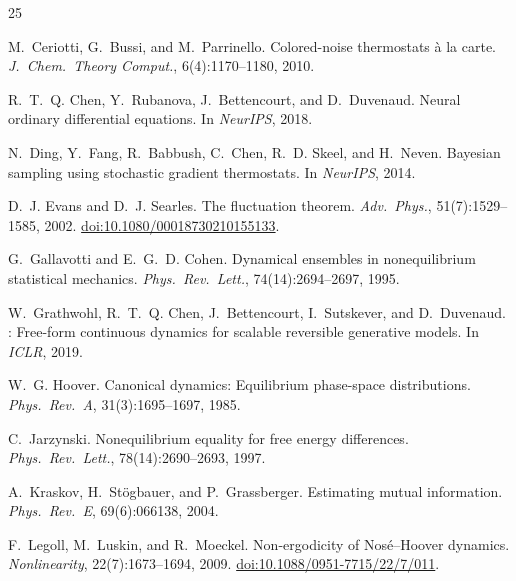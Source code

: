 \documentclass[11pt]{article}
\providecommand{\doi}[1]{\href{https://doi.org/#1}{doi:#1}}
\begin{document}
\begin{thebibliography}{25}

M.~Ceriotti, G.~Bussi, and M.~Parrinello.
\newblock Colored-noise thermostats \`{a} la carte.
\newblock \emph{J.~Chem.\ Theory Comput.}, 6(4):1170--1180, 2010.

R.~T.~Q. Chen, Y.~Rubanova, J.~Bettencourt, and D.~Duvenaud.
\newblock Neural ordinary differential equations.
\newblock In \emph{NeurIPS}, 2018.

N.~Ding, Y.~Fang, R.~Babbush, C.~Chen, R.~D. Skeel, and H.~Neven.
\newblock Bayesian sampling using stochastic gradient thermostats.
\newblock In \emph{NeurIPS}, 2014.

D.~J. Evans and D.~J. Searles.
\newblock The fluctuation theorem.
\newblock \emph{Adv.\ Phys.}, 51(7):1529--1585, 2002.
\newblock \doi{10.1080/00018730210155133}.

G.~Gallavotti and E.~G.~D. Cohen.
\newblock Dynamical ensembles in nonequilibrium statistical mechanics.
\newblock \emph{Phys.\ Rev.\ Lett.}, 74(14):2694--2697, 1995.

W.~Grathwohl, R.~T.~Q. Chen, J.~Bettencourt, I.~Sutskever, and D.~Duvenaud.
: Free-form continuous dynamics for scalable reversible
  generative models.
\newblock In \emph{ICLR}, 2019.

W.~G. Hoover.
\newblock Canonical dynamics: Equilibrium phase-space distributions.
\newblock \emph{Phys.\ Rev.\ A}, 31(3):1695--1697, 1985.

C.~Jarzynski.
\newblock Nonequilibrium equality for free energy differences.
\newblock \emph{Phys.\ Rev.\ Lett.}, 78(14):2690--2693, 1997.

A.~Kraskov, H.~St\"{o}gbauer, and P.~Grassberger.
\newblock Estimating mutual information.
\newblock \emph{Phys.\ Rev.\ E}, 69(6):066138, 2004.

F.~Legoll, M.~Luskin, and R.~Moeckel.
\newblock Non-ergodicity of Nos\'{e}--Hoover dynamics.
\newblock \emph{Nonlinearity}, 22(7):1673--1694, 2009.
\newblock \doi{10.1088/0951-7715/22/7/011}.


\end{thebibliography}
\end{document}
